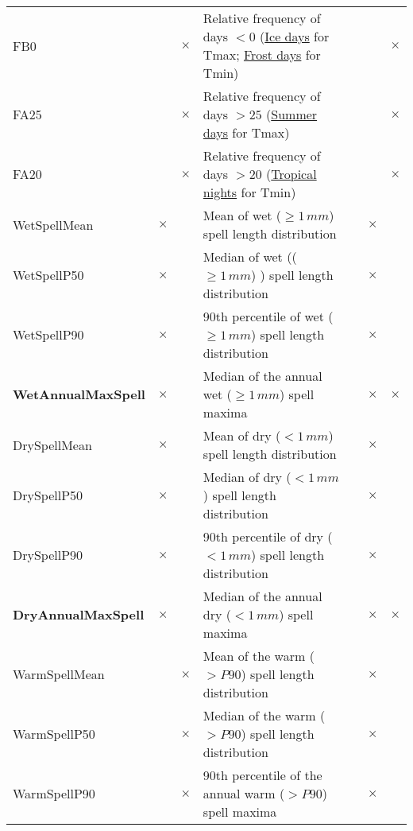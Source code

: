 \documentclass[11pt]{amsart}
\begin{document}
\begin{table}[!htb]
{\begin{tabular}{lllllll}
FB0                         &    & $\times$  & Relative frequency of days $< 0$ (\underline{Ice days} for Tmax; \underline{Frost days} for Tmin)   & & & $\times$  \\
FA25                        &           & $\times$  & Relative frequency of days $> 25$ (\underline{Summer days} for Tmax)                    & & & $\times$ \\
FA20                        &           & $\times$  & Relative frequency of days $> 20$ (\underline{Tropical nights} for Tmin)                & & & $\times$  \\
WetSpellMean                & $\times$  &           & Mean of wet ($\ge 1\, mm$) spell length distribution                             & &  $\times$  &  \\ 	
WetSpellP50                 & $\times$  &           & Median of wet (($\ge 1\, mm$)   ) spell length distribution                           & & $\times$&    \\
WetSpellP90                 & $\times$  &           & 90th percentile of wet ($\ge 1\, mm$)  spell length distribution         		& & $\times$&    \\
\textbf{WetAnnualMaxSpell}  & $\times$  &           & Median of the annual wet ($\ge 1\, mm$) spell maxima                  			& & $\times$& $\times$  \\
DrySpellMean                & $\times$  &           & Mean of dry ($< 1\, mm$) spell length distribution                              & &  $\times$  &  \\
DrySpellP50                 & $\times$  &           & Median of dry ($< 1\, mm$) spell length distribution  	        				& & $\times$&    \\
DrySpellP90                 & $\times$  &           & 90th percentile of dry ($< 1\, mm$)  spell length distribution             		& &$\times$ &    \\
\textbf{DryAnnualMaxSpell}  & $\times$  &           & Median of the annual dry ($< 1\, mm$) spell maxima                    			& & $\times$& $\times$  \\
WarmSpellMean               &           & $\times$  & Mean of the warm ($> P90$) spell length distribution            & &  $\times$  &  \\
WarmSpellP50                &           & $\times$  & Median of the warm ($> P90$) spell length distribution          & & $\times$&    \\
WarmSpellP90                &           & $\times$  & 90th percentile of the annual warm ($> P90$) spell maxima       & & $\times$&   \\

\end{tabular}}
\end{table}
\end{document}
